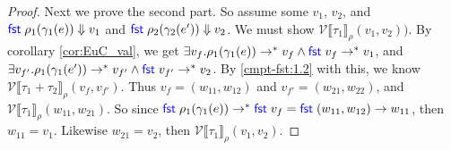 \documentclass[twoside,11pt,openright]{report}
\theoremstyle{definition}
\newcommand{\Keyword}[1]{{\color{blue} \mathsf{#1}}}
\newcommand{\expr}{e}
\newcommand{\val}{v}
\newcommand{\valB}{w}
\newcommand{\Fst}{\Keyword{fst}\;}
\newcommand{\Tsum}[2]{#1 + #2}
\newcommand{\typ}{\tau}
\newcommand{\step}{\rightarrow}
\newcommand{\stepS}{\rightarrow^*}
\newcommand{\ValInp}[2]{\mathcal{V} \llbracket #1 \rrbracket_{#2}}
\newcommand{\ValInpGen}[2]{\ValInp{#1}{#2}(\val_1, \val_2)}
\begin{document}
\begin{proof}
  Next we prove the second part. So assume some $\val_1$, $\val_2$, and $\Fst \rho_1 ( \gamma_1(\expr)) \Downarrow \val_1$ and $\Fst \rho_2(\gamma_2(\expr')) \Downarrow \val_2$. We must show $\ValInpGen{\typ_1}{\rho})$. By corollary \ref{cor:EuC_val}, we get $\exists \val_f . \rho_1(\gamma_1(\expr)) \stepS \val_f \land \Fst \val_f \stepS \val_1$, and $\exists \val_{f'}. \rho_1(\gamma_1(\expr')) \stepS \val_{f'} \land \Fst \val_{f'} \stepS \val_2$. By \ref{cmpt-fst:1.2} with this, we know $\ValInp{\Tsum{\typ_1}{\typ_2}}{\rho}(\val_f, \val_{f'})$. Thus $\val_{f} = (\valB_{11}, \valB_{12})$ and $\val_{f'} = (\valB_{21}, \valB_{22})$, and $\ValInp{\typ_1}{\rho}(\valB_{11}, \valB_{21})$. So since $\Fst \rho_1(\gamma_1(\expr)) \stepS \Fst \val_{f} = \Fst (\valB_{11}, \valB_{12}) \step \valB_{11}$, then $\valB_{11} = \val_1$. Likewise $\valB_{21} = \val_2$, then $\ValInpGen{\typ_1}{\rho}$.
\end{proof}
\end{document}
